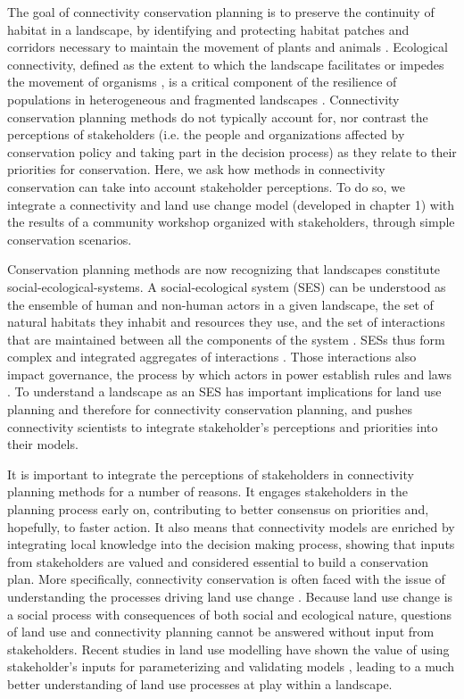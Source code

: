 
The goal of connectivity conservation planning is to preserve the continuity of habitat in a landscape, by identifying and protecting habitat patches and corridors necessary to maintain the movement of plants and animals \citep{keeley_thirty_2019}. Ecological connectivity, defined as the extent to which the landscape facilitates or impedes the movement of organisms \citep{crooks_landscape_2006}, is a critical component of the resilience of populations in heterogeneous and fragmented landscapes \citep{gonzalez_spatial_2017}. Connectivity conservation planning methods do not typically account for, nor contrast the perceptions of stakeholders (i.e. the people and organizations affected by conservation policy and taking part in the decision process) as they relate to  their priorities for conservation. Here, we ask how methods in connectivity conservation can take into account stakeholder perceptions. To do so, we integrate a connectivity and land use change model (developed in chapter 1) with the results of a community workshop organized with stakeholders, through simple conservation scenarios.

Conservation planning methods are now recognizing that landscapes constitute social-ecological-systems. A social-ecological system (SES) can be understood as the ensemble of human and non-human actors in a given landscape, the set of natural habitats they inhabit and resources they use, and the set of interactions that are maintained between all the components of the system \citep{ostrom_general_2009}. SESs thus form complex and integrated aggregates of interactions \citep{hinkel_enhancing_2014}. Those interactions also impact governance, the process by which actors in power establish rules and laws \citep{bissonnette_comparing_2018}. To understand a landscape as an SES has important implications for land use planning and therefore for connectivity conservation planning, and pushes connectivity scientists to integrate stakeholder’s perceptions and priorities into their models. 

It is important to integrate the perceptions of stakeholders in connectivity planning methods for a number of reasons. It engages stakeholders in the planning process early on, contributing to better consensus on priorities and, hopefully, to faster action. It also means that connectivity models are enriched by integrating local knowledge into the decision making process, showing that inputs from stakeholders are valued and considered essential to build a conservation plan. More specifically, connectivity conservation is often faced with the issue of understanding the processes driving land use change \citep{worboys_connectivity_2010}. Because land use change is a social process with consequences of both social and ecological nature, questions of land use and connectivity planning cannot be answered without input from stakeholders. Recent studies in land use modelling have shown the value of using stakeholder’s inputs for parameterizing and validating models \citep{hewitt_participatory_2014, voinov_modelling_2010}, leading to a much better understanding of land use processes at play within a landscape.


